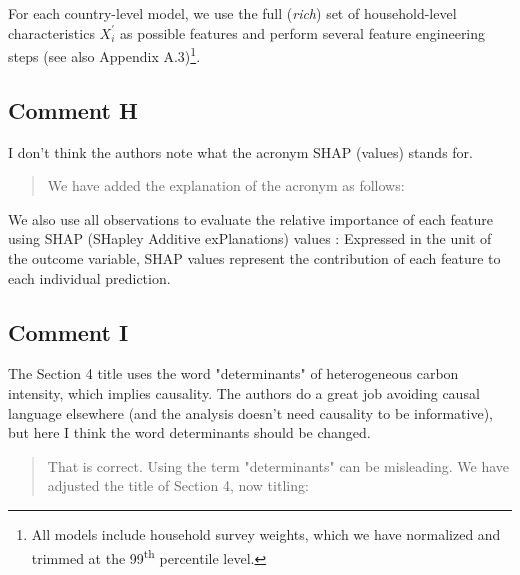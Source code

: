 \documentclass[11pt]{article}
\newenvironment{response}
{\begin{quote}\color{black}}
{\end{quote}}
\begin{document}
\begin{revisionbox}
    For each country-level model, we use the full (\textit{rich}) set of household-level characteristics $X_{i}^{'}$ as possible features and perform several feature engineering steps (see also Appendix A.3)\footnote{All models include household survey weights, which we have normalized and trimmed at the 99\textsuperscript{th} percentile level.}.
\end{revisionbox}

\subsection*{Comment H}\label{comment_R1_H}

\begin{commentbox}
    I don't think the authors note what the acronym SHAP (values) stands for.
\end{commentbox}

\begin{response}

We have added the explanation of the acronym as follows:

\end{response}

\begin{revisionbox}
    We also use all observations to evaluate the relative importance of each feature using SHAP (SHapley Additive exPlanations) values \autocite{Lundberg.2017}: Expressed in the unit of the outcome variable, SHAP values represent the contribution of each feature to each individual prediction.
\end{revisionbox}

\subsection*{Comment I}\label{comment_R1_I}

\begin{commentbox}
    The Section 4 title uses the word "determinants" of heterogeneous carbon intensity, which implies causality. The authors do a great job avoiding causal language elsewhere (and the analysis doesn't need causality to be informative), but here I think the word determinants should be changed.
\end{commentbox}

\begin{response}
    That is correct. Using the term "determinants" can be misleading. We have adjusted the title of Section 4, now titling:
\end{response}
\end{document}
